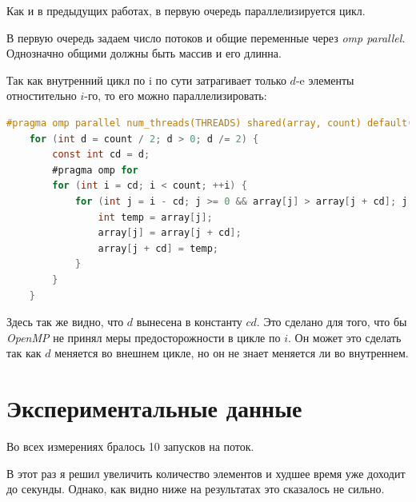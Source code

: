 \documentclass[a4paper, 12pt]{article}
\begin{document}
Как и в предыдущих работах, в первую очередь параллелизируется цикл.

В первую очередь задаем число потоков и общие переменные через \textit{omp parallel}. Однозначно общими должны быть массив и его длинна.

Так как внутренний цикл по i по сути затрагивает только $d$-e элементы отностительно $i$-го, то его можно параллелизировать:

\begin{lstlisting}[language=C, basicstyle=\scriptsize]
 #pragma omp parallel num_threads(THREADS) shared(array, count) default(none)
    for (int d = count / 2; d > 0; d /= 2) {
        const int cd = d;
        #pragma omp for
        for (int i = cd; i < count; ++i) {
            for (int j = i - cd; j >= 0 && array[j] > array[j + cd]; j -= cd) {
                int temp = array[j];
                array[j] = array[j + cd];
                array[j + cd] = temp;
            }
        }
    }
\end{lstlisting}

Здесь так же видно, что $d$ вынесена в константу $cd$. Это сделано для того, что бы \textit{OpenMP} не принял меры предосторожности в цикле по $i$. Он может это сделать так как $d$ меняется во внешнем цикле, но он не знает меняется ли во внутреннем.



\section{Экспериментальные данные}

Во всех измерениях бралось 10 запусков на поток.

В этот раз я решил увеличить количество элементов и худшее время уже доходит до секунды. Однако, как видно ниже на результатах это сказалось не сильно.

\vspace{0.3cm}

\end{document}
